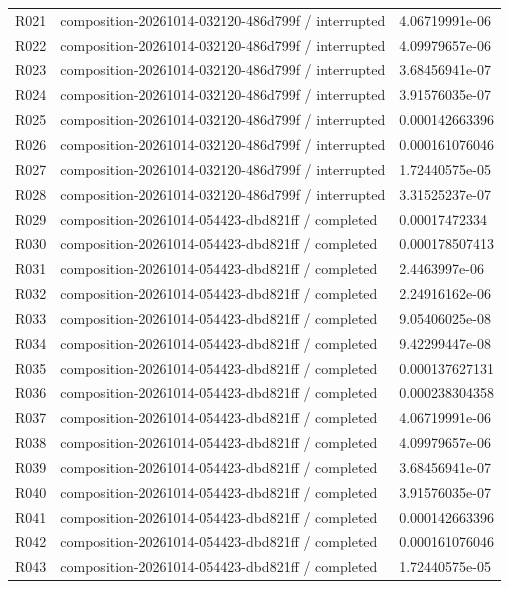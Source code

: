 \documentclass[10pt]{article}
\begin{document}
{\begin{longtable}{p{}p{}p{}}
R021 & composition-20261014-032120-486d799f / interrupted & 4.06719991e-06 \\
R022 & composition-20261014-032120-486d799f / interrupted & 4.09979657e-06 \\
R023 & composition-20261014-032120-486d799f / interrupted & 3.68456941e-07 \\
R024 & composition-20261014-032120-486d799f / interrupted & 3.91576035e-07 \\
R025 & composition-20261014-032120-486d799f / interrupted & 0.000142663396 \\
R026 & composition-20261014-032120-486d799f / interrupted & 0.000161076046 \\
R027 & composition-20261014-032120-486d799f / interrupted & 1.72440575e-05 \\
R028 & composition-20261014-032120-486d799f / interrupted & 3.31525237e-07 \\
R029 & composition-20261014-054423-dbd821ff / completed & 0.00017472334 \\
R030 & composition-20261014-054423-dbd821ff / completed & 0.000178507413 \\
R031 & composition-20261014-054423-dbd821ff / completed & 2.4463997e-06 \\
R032 & composition-20261014-054423-dbd821ff / completed & 2.24916162e-06 \\
R033 & composition-20261014-054423-dbd821ff / completed & 9.05406025e-08 \\
R034 & composition-20261014-054423-dbd821ff / completed & 9.42299447e-08 \\
R035 & composition-20261014-054423-dbd821ff / completed & 0.000137627131 \\
R036 & composition-20261014-054423-dbd821ff / completed & 0.000238304358 \\
R037 & composition-20261014-054423-dbd821ff / completed & 4.06719991e-06 \\
R038 & composition-20261014-054423-dbd821ff / completed & 4.09979657e-06 \\
R039 & composition-20261014-054423-dbd821ff / completed & 3.68456941e-07 \\
R040 & composition-20261014-054423-dbd821ff / completed & 3.91576035e-07 \\
R041 & composition-20261014-054423-dbd821ff / completed & 0.000142663396 \\
R042 & composition-20261014-054423-dbd821ff / completed & 0.000161076046 \\
R043 & composition-20261014-054423-dbd821ff / completed & 1.72440575e-05 \\

\end{longtable}}
\end{document}
